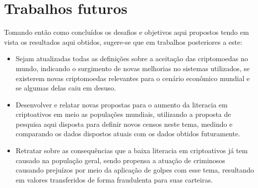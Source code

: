 \section{Trabalhos futuros}
Tomando então como concluídos os desafios e objetivos aqui propostos tendo em vista os resultados aqui obtidos, sugere-se que em trabalhos posteriores a este:
\begin{itemize}
	\item Sejam atualizadas todas as definições sobre a aceitação das criptomoedas no mundo, indicando o surgimento de novas melhorias no sistemas utilizados, se existerem novas criptomoedas relevantes para o cenário econômico mundial e se algumas delas caiu em desuso.
	\item Desenvolver e relatar novas propostas para o aumento da literacia em criptoativos em meio as populações mundiais, utilizando a proposta de pesquisa aqui disposta para definir novos censos neste tema, medindo e comparando os dados dispostos atuais com os dados obtidos futuramente.   
	\item Retratar sobre as consequências que a baixa  literacia em criptoativos já tem causado na população geral, sendo propensa a atuação de criminosos causando prejuízos por meio da aplicação  de golpes com esse tema, resultando em valores transferidos de forma fraudulenta para suas carteiras.
\end{itemize}   
 


